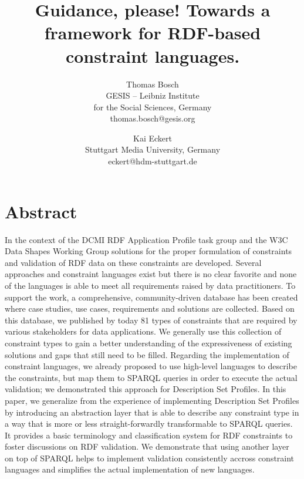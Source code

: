 \documentclass[a4paper,fontsize=11pt]{scrartcl}
\date{}
\begin{document}
\title{\vspace{-1em}Guidance, please! Towards a framework for RDF-based constraint languages.}

\author{Thomas Bosch\\GESIS – Leibniz Institute \\for the Social Sciences, Germany\\thomas.bosch@gesis.org \and Kai Eckert\\Stuttgart Media University, Germany\\eckert@hdm-stuttgart.de}

\maketitle
\vspace{-3em}
\section*{Abstract}
In the context of the DCMI RDF Application Profile task group and the W3C Data Shapes Working Group solutions for the proper formulation of constraints and validation of RDF data on these constraints are developed. Several approaches and constraint languages exist but there is no clear favorite and none of the languages is able to meet all requirements raised by data practitioners.
To support the work, a comprehensive, community-driven database has been created where case studies, use cases, requirements and solutions are collected. Based on this database,
we published by today 81 types of constraints that are required by various stakeholders for data applications. We generally use this collection of constraint types to gain a better understanding of the expressiveness of existing solutions and gaps that still need to be filled. 
Regarding the implementation of constraint languages, we already proposed to use high-level languages to describe the constraints, but map them to SPARQL queries in order to execute the actual validation; we demonstrated this approach for Description Set Profiles.
In this paper, we generalize from the experience of implementing Description Set Profiles by introducing an abstraction layer that is able to describe any constraint type in a way that is more or less straight-forwardly transformable to SPARQL queries. 
It provides a basic terminology and classification system for RDF constraints to foster discussions on RDF validation.
We demonstrate that using another layer on top of SPARQL helps to implement validation consistently accross constraint languages and simplifies the actual implementation of new languages.
\end{document}
